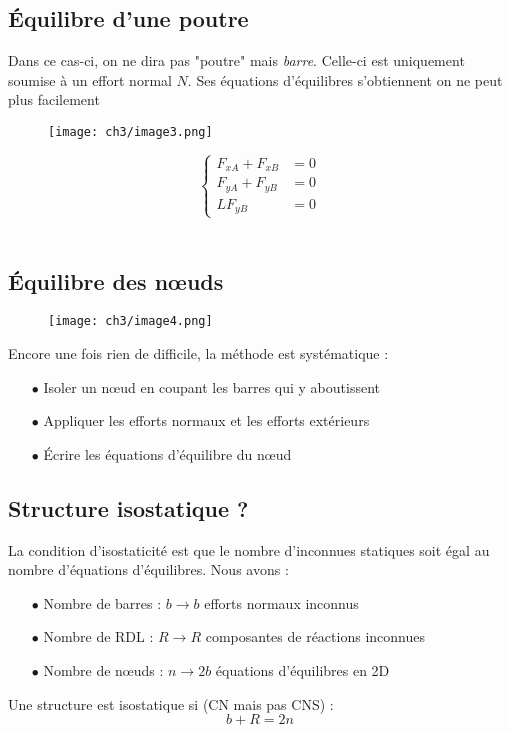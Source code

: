 	\subsection{Équilibre d'une poutre}
	Dans ce cas-ci, on ne dira pas "poutre" mais \textit{barre}. Celle-ci est 
	uniquement soumise à un effort normal $N$. Ses équations d'équilibres 
	s'obtiennent on ne peut plus facilement\\
	\begin{wrapfigure}[6]{l}{7.5cm}
	\vspace{-8mm}
	\texttt{[image: ch3/image3.png]}
	\end{wrapfigure}
	\begin{equation}
	\left\{\begin{array}{ll}
	F_{xA} + F_{xB} &=0\\
	F_{yA} + F_{yB} &= 0\\
	LF_{yB} &=0
	\end{array}\right.
	\end{equation}\ \\
	
	
	\subsection{Équilibre des nœuds}
	\begin{wrapfigure}[7]{r}{6.5cm}
	\vspace{-4mm}
	\texttt{[image: ch3/image4.png]}
	\end{wrapfigure}
		Encore une fois rien de difficile, la méthode est systématique :
	\begin{itemize}
	\item[$\bullet$] Isoler un nœud en coupant les barres qui y aboutissent
	\item[$\bullet$] Appliquer les efforts normaux et les efforts extérieurs
	\item[$\bullet$] Écrire les équations d’équilibre du nœud
	\end{itemize}
	
	\subsection{Structure isostatique ?}
	La condition d'isostaticité est que le nombre d'inconnues statiques soit 
	égal au nombre d'équations d'équilibres. Nous avons :
	\begin{itemize}
	\item[$\bullet$] Nombre de barres : $b \rightarrow b$ efforts normaux 
	inconnus
	\item[$\bullet$] Nombre de RDL : $R \rightarrow R$ composantes de réactions 
	inconnues
	\item[$\bullet$] Nombre de nœuds : $n\rightarrow 2b$ équations d'équilibres 
	en 2D
	\end{itemize}
	Une structure est isostatique si (CN mais pas CNS) :
	\begin{equation}
	b + R = 2n
	\end{equation}
	\newpage
	
